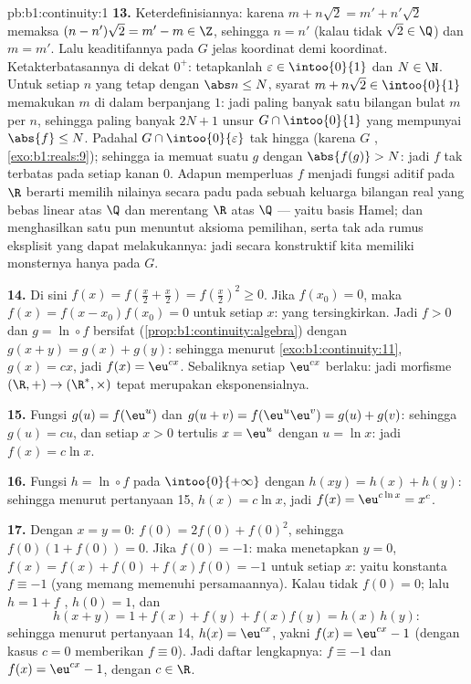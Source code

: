 \begin{solution}{pb:b1:continuity:1}
\textbf{13.} Keterdefinisiannya: karena $m + n\sqrt2 = m' + n'\sqrt2$ memaksa
$(n - n')\sqrt2 = m' - m \in \Z$, sehingga $n = n'$ (kalau tidak $\sqrt2 \in
\Q$) dan $m = m'$. Lalu keaditifannya pada $G$ jelas koordinat demi
koordinat. Ketakterbatasannya di dekat $0^+$: tetapkanlah $\varepsilon \in
\intoo{0}{1}$ dan $N \in \N$. Untuk setiap $n$ yang tetap dengan $\abs n
\leq N$, syarat $m + n\sqrt2 \in \intoo{0}{1}$ memakukan $m$
di dalam  berpanjang $1$: jadi paling banyak satu bilangan bulat $m$ per
$n$, sehingga paling banyak $2N + 1$ unsur $G \cap \intoo{0}{1}$ yang mempunyai
$\abs{f} \leq N$. Padahal $G \cap \intoo{0}{\varepsilon}$
tak hingga (karena $G$ , \cref{exo:b1:reals:9}); sehingga ia
memuat suatu $g$ dengan $\abs{f(g)} > N$: jadi $f$ tak terbatas pada
setiap  kanan $0$. Adapun memperluas $f$ menjadi fungsi
aditif pada $\R$ berarti memilih nilainya secara padu pada sebuah keluarga
bilangan real yang bebas linear atas $\Q$ dan merentang $\R$ atas $\Q$
--- yaitu basis Hamel; dan menghasilkan satu pun menuntut aksioma pemilihan,
serta tak ada rumus eksplisit yang dapat melakukannya: jadi secara konstruktif kita memiliki
monsternya hanya pada $G$.

\textbf{14.} Di sini $f(x) = f(\frac x2 + \frac x2) = f(\frac x2)^2 \geq
0$. Jika $f(x_0) = 0$, maka $f(x) = f(x - x_0)f(x_0) = 0$ untuk setiap
$x$: yang tersingkirkan. Jadi $f > 0$ dan $g = \ln \circ f$ bersifat 
(\cref{prop:b1:continuity:algebra}) dengan $g(x + y) = g(x) +
g(y)$: sehingga menurut \cref{exo:b1:continuity:11}, $g(x) = cx$, jadi $f(x) =
\eu^{cx}$. Sebaliknya setiap $\eu^{cx}$ berlaku: jadi morfisme
 $(\R, +) \to (\R^*, \times)$ tepat merupakan
eksponensialnya.

\textbf{15.} Fungsi $g(u) = f(\eu^u)$  dan $g(u + v) =
f(\eu^u \eu^v) = g(u) + g(v)$: sehingga $g(u) = cu$, dan setiap $x > 0$
tertulis $x = \eu^u$ dengan $u = \ln x$: jadi $f(x) = c\ln x$.

\textbf{16.} Fungsi $h = \ln \circ f$  pada
$\intoo{0}{+\infty}$ dengan $h(xy) = h(x) + h(y)$: sehingga menurut pertanyaan 15,
$h(x) = c\ln x$, jadi $f(x) = \eu^{c\ln x} = x^c$.

\textbf{17.} Dengan $x = y = 0$: $f(0) = 2f(0) + f(0)^2$, sehingga $f(0)(1 +
f(0)) = 0$. Jika $f(0) = -1$: maka menetapkan $y = 0$, $f(x) = f(x) +
f(0) + f(x)f(0) = -1$ untuk setiap $x$: yaitu konstanta $f \equiv -1$
(yang memang memenuhi persamaannya). Kalau tidak $f(0) = 0$; lalu $h
= 1 + f$ , $h(0) = 1$, dan
\[
h(x + y) = 1 + f(x) + f(y) + f(x)f(y) = h(x)\,h(y) :
\]
sehingga menurut pertanyaan 14, $h(x) = \eu^{cx}$, yakni $f(x) = \eu^{cx} - 1$
(dengan kasus $c = 0$ memberikan $f \equiv 0$). Jadi daftar lengkapnya: $f
\equiv -1$ dan $f(x) = \eu^{cx} - 1$, dengan $c \in \R$.


\end{solution}
